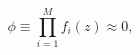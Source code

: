 \begin{equation}
\phi \equiv \prod\limits_{i=1}^{M}f_{i}(z)\approx 0,  \label{multilinear}
\end{equation}

